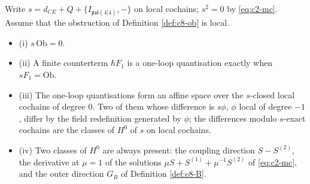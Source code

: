 \begin{theorem}
\label{thm:c8-obstruction}
Write $s=d_{CE}+Q+\{I_{\mathfrak{psl}(4|4)},-\}$ on local cochains; $s^2=0$ by \eqref{eq:c2-mc}. Assume that the obstruction of Definition \ref{def:c8-ob} is local.
\begin{itemize}
\item (i) $s\,\mathrm{Ob}=0$.
\item (ii) A finite counterterm $\hbar F_1$ is a one-loop quantisation exactly when $sF_1=\mathrm{Ob}$.
\item (iii) The one-loop quantisations form an affine space over the $s$-closed local cochains of degree $0$. Two of them whose difference is $s\phi$, $\phi$ local of degree $-1$, differ by the field redefinition generated by $\phi$; the differences modulo $s$-exact cochains are the classes of $H^0$ of $s$ on local cochains.
\item (iv) Two classes of $H^0$ are always present: the coupling direction $S-S^{(2)}$, the derivative at $\mu=1$ of the solutions $\mu S+S^{(1)}+\mu^{-1}S^{(2)}$ of \eqref{eq:c2-mc}, and the outer direction $G_B$ of Definition \ref{def:c8-B}.
\end{itemize}
\end{theorem}

